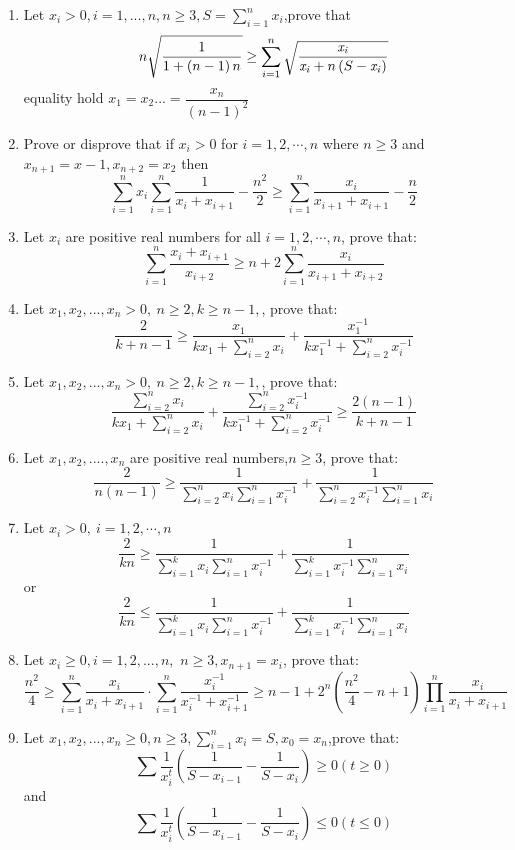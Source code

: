 \documentclass{report}
\begin{document}
\begin{enumerate}
	\item Let $x_i>0,i=1,...,n,n\geq 3,S=\sum_{i=1}^n{x_i}$,prove that\[n\sqrt {{\frac {1}{1+ \left( n-1 \right) n}}}\geq \sum_{i=1}^n{\sqrt {{\frac {{\it x_i}}{{\it x_i}+n \left( S-{\it x_i} \right) }}}}\]equality hold $x_1=x_2...=\dfrac{x_n}{(n-1)^2}$
	\item Prove or disprove that if $x_i>0$ for $i=1,2,\cdots,n$ where $n\geq 3$ and $x_{n+1}=x-1, x_{n+2}=x_2$ then \[\sum \limits_{i=1}^nx_i\sum \limits_{i=1}^n \frac{1}{x_i+x_{i+1}}-\frac{n^2}{2}\geq\sum \limits_{i=1}^n \frac{x_i}{x_{i+1}+x_{i+1}}-\frac{n}{2} \]
	\item Let $ x_i$ are positive real numbers for all $i=1,2,\cdots,n$, prove that:\[\sum_{i=1}^n\frac{x_i+x_{i+1}}{x_{i+2}}\geq n+2\sum_{i=1}^n \frac{x_i}{x_{i+1}+x_{i+2}}\]
	\item Let $ x_1,x_2,...,x_n > 0,\ n \geq 2 ,k \geq n - 1,$, prove that:\[{ \frac {2}{k + n - 1} \geq \frac {x_1}{kx_1 + \sum\limits_{i = 2}^n{x_i}} + \frac {x_1^{ - 1}}{kx_1^{ - 1} + \sum\limits_{i = 2}^n{x_i^{ - 1}}}}\]
	\item Let $ x_1,x_2,...,x_n > 0,\ n \geq 2 ,k \geq n - 1,$, prove that:\[\frac {\sum\limits_{i = 2}^n{x_i}}{kx_1 + \sum\limits_{i = 2}^n{x_i}}+\frac {\sum\limits_{i = 2}^n{x_i^{-1}}}{kx_1^{-1} + \sum\limits_{i = 2}^n{x_i^{-1}}} \geq \frac{2(n - 1)}{k + n - 1}\]
	\item Let $ x_1,x_2,....,x_n$ are positive real numbers,$ n \geq 3$, prove that:$$ \frac {2}{n(n - 1)}\geq \frac {1}{\sum_{i = 2}^n{x_i}\sum_{i = 1}^n{x_i^{ - 1}}} + \frac {1}{\sum_{i = 2}^n{x_i^{ - 1}}\sum_{i = 1}^n{x_i}}$$
	\item Let $x_i> 0,\ i=1,2,\cdots,n$ $$\frac {2}{kn}\geq \frac {1}{\sum_{i = 1}^k{x_i}\sum_{i = 1}^n{x_i^{ - 1}}} + \frac {1}{\sum_{i = 1}^k{x_i^{ - 1}}\sum_{i = 1}^n{x_i}}$$or$$\frac {2}{kn}\le \frac {1}{\sum_{i = 1}^k{x_i}\sum_{i = 1}^n{x_i^{ - 1}}} + \frac {1}{\sum_{i = 1}^k{x_i^{ - 1}}\sum_{i = 1}^n{x_i}}$$
	\item Let $ x_i \geq 0,i = 1,2,...,n,$ $n \geq 3,x_{n + 1} = x_i$, prove   that:$$\frac{n^2}{4}\geq \sum \limits_{i=1}^n\frac{x_i}{x_i+x_{i+1}}\cdot \sum \limits_{i=1}^n\frac{x_i^{-1}}{x_i^{-1}+x_{i+1}^{-1}}\geq n-1+2^n\left(\frac{n^2}{4}-n+1\right)\prod \limits_{i=1}^n\frac{x_i}{x_i+x_{i+1}}$$
	\item Let $ x_1,x_2,...,x_n \geq 0,n \geq 3,\sum_{i = 1}^n{x_i} = S,x_0 = x_n$,prove that:$$ \sum{\frac {1}{x_i^t}(\frac {1}{S - x_{i - 1}} - \frac {1}{S - x_i})} \geq0 (t \geq 0)$$and$$ \sum{\frac {1}{x_i^t}(\frac {1}{S - x_{i - 1}} - \frac {1}{S - x_i})} \le0 (t \le 0)$$
	
	
	
	
	
	
	
	
	
\end{enumerate}
\end{document}
